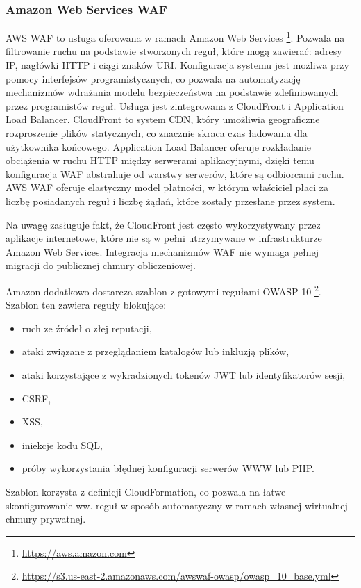 \documentclass[11pt,a4paper,polish,thesis]{dcsbook}
\begin{document}
\subsubsection{Amazon Web Services WAF}
AWS WAF \cite{awswaf} to usługa oferowana w ramach Amazon Web Services \footnote{\url{https://aws.amazon.com}}. Pozwala na filtrowanie ruchu na podstawie stworzonych reguł, które mogą zawierać: adresy IP, nagłówki HTTP i ciągi znaków URI. Konfiguracja systemu jest możliwa przy pomocy interfejsów programistycznych, co pozwala na automatyzację mechanizmów wdrażania modelu bezpieczeństwa na podstawie zdefiniowanych przez programistów reguł. Usługa jest zintegrowana z CloudFront i Application Load Balancer. CloudFront to system CDN, który umożliwia geograficzne rozproszenie plików statycznych, co znacznie skraca czas ładowania dla użytkownika końcowego. Application Load Balancer oferuje rozkładanie obciążenia w ruchu HTTP między serwerami aplikacyjnymi, dzięki temu konfiguracja WAF abstrahuje od warstwy serwerów, które są odbiorcami ruchu. AWS WAF oferuje elastyczny model płatności, w którym właściciel płaci za liczbę posiadanych reguł i liczbę żądań, które zostały przesłane przez system.

Na uwagę zasługuje fakt, że CloudFront jest często wykorzystywany przez aplikacje internetowe, które nie są w pełni utrzymywane w infrastrukturze Amazon Web Services. Integracja mechanizmów WAF nie wymaga pełnej migracji do publicznej chmury obliczeniowej.

Amazon dodatkowo dostarcza szablon z gotowymi regułami OWASP 10 \footnote{\url{https://s3.us-east-2.amazonaws.com/awswaf-owasp/owasp_10_base.yml}}. Szablon ten zawiera reguły blokujące:
\begin{itemize}
\item ruch ze źródeł o złej reputacji,
\item ataki związane z przeglądaniem katalogów lub inkluzją plików,
\item ataki korzystające z wykradzionych tokenów JWT lub identyfikatorów sesji,
\item CSRF,
\item XSS,
\item iniekcje kodu SQL,
\item próby wykorzystania błędnej konfiguracji serwerów WWW lub PHP.
\end{itemize}
Szablon korzysta z definicji CloudFormation, co pozwala na łatwe skonfigurowanie ww. reguł w sposób automatyczny w ramach własnej wirtualnej chmury prywatnej.
\end{document}
